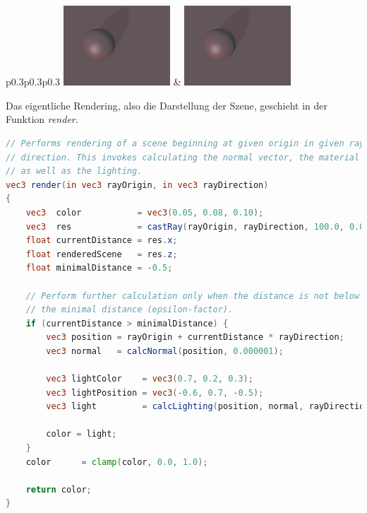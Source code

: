 \begin{table}[H]
\begin{tabular}{p{0.3\textwidth}p{0.3\textwidth}p{0.3\textwidth}}
            \includegraphics[width=0.3\textwidth]{img/sphere_tracing_shadows_128.pdf} \newline &
            \includegraphics[width=0.3\textwidth]{img/sphere_tracing_shadows_256.pdf} \newline \\
        \bottomrule
    \end{tabular}
\end{table}

Das eigentliche Rendering, also die Darstellung der Szene, geschieht in
der Funktion \textit{render}.

\begin{minipage}{\linewidth}
\begin{lstlisting}[language=GLSL,caption={Funktion zur Darstellung der
        Szene in
        GLSL. Die Szene bzw.\ der Farbwert wird nur dann zurückgegeben
        bzw.\ berechnet, wenn eine minimale Distanz nicht unterschritten
        wird.},label={alg:glsl_render},captionpos=b,emph={render}]
// Performs rendering of a scene beginning at given origin in given ray
// direction. This invokes calculating the normal vector, the material
// as well as the lighting.
vec3 render(in vec3 rayOrigin, in vec3 rayDirection)
{
    vec3  color           = vec3(0.05, 0.08, 0.10);
    vec3  res             = castRay(rayOrigin, rayDirection, 100.0, 0.00001, 100);
    float currentDistance = res.x;
    float renderedScene   = res.z;
    float minimalDistance = -0.5;

    // Perform further calculation only when the distance is not below
    // the minimal distance (epsilon-factor).
    if (currentDistance > minimalDistance) {
        vec3 position = rayOrigin + currentDistance * rayDirection;
        vec3 normal   = calcNormal(position, 0.000001);

        vec3 lightColor    = vec3(0.7, 0.2, 0.3);
        vec3 lightPosition = vec3(-0.6, 0.7, -0.5);
        vec3 light         = calcLighting(position, normal, rayDirection, material, lightPosition, lightColor);

        color = light;
    }
    color      = clamp(color, 0.0, 1.0);

    return color;
}
\end{lstlisting}
\end{minipage}

